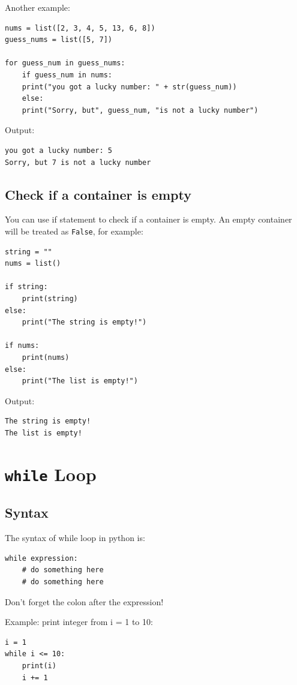 \documentclass[12pt]{book}
\begin{document}
Another example:
\begin{verbatim}
nums = list([2, 3, 4, 5, 13, 6, 8])
guess_nums = list([5, 7])

for guess_num in guess_nums:
    if guess_num in nums:
	print("you got a lucky number: " + str(guess_num))
    else:
	print("Sorry, but", guess_num, "is not a lucky number")
\end{verbatim}
Output:
\begin{verbatim}
you got a lucky number: 5
Sorry, but 7 is not a lucky number
\end{verbatim}

\subsection{Check if a container is empty}
\label{sec:org3400efb}
You can use if statement to check if a container is empty. An empty container will be treated as \texttt{False}, for example:
\begin{verbatim}
string = ""
nums = list()

if string:
    print(string)
else:
    print("The string is empty!")

if nums:
    print(nums)
else:
    print("The list is empty!")
\end{verbatim}
Output:
\begin{verbatim}
The string is empty!
The list is empty!
\end{verbatim}

\section{\texttt{while} Loop}
\label{sec:orgc00e4e9}
\subsection{Syntax}
\label{sec:orgebf8134}
The syntax of while loop in python is:
\begin{verbatim}
while expression:
    # do something here
    # do something here
\end{verbatim}
Don't forget the colon after the expression!

Example: print integer from i = 1 to 10:
\begin{verbatim}
i = 1
while i <= 10:
    print(i)
    i += 1
\end{verbatim}
\end{document}
